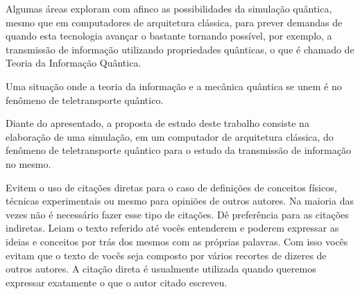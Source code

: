 \documentclass[12pt,oneside,brazil,hidelinks,article,sumario=tradicional,a4paper]{abntex2}
\begin{document}
Algumas áreas exploram com afinco as possibilidades da simulação quântica, mesmo que em computadores de arquitetura clássica, para prever demandas de quando esta tecnologia avançar o bastante tornando possível, por exemplo, a transmissão de informação utilizando propriedades quânticas, o que é chamado de Teoria da Informação Quântica.

Uma situação onde a teoria da informação e a mecânica quântica se unem é no fenômeno de teletransporte quântico.

Diante do apresentado, a proposta de estudo deste trabalho consiste na elaboração de uma simulação, em um computador de arquitetura clássica, do fenômeno de teletransporte quântico para o estudo da transmissão de informação no mesmo.



Evitem o uso de citações diretas para o caso de definições de conceitos físicos, técnicas experimentais ou mesmo para opiniões de outros autores. Na maioria das vezes não é necessário fazer esse tipo de citações. Dê preferência para as citações indiretas. Leiam o texto referido até vocês entenderem e poderem expressar as ideias e conceitos por trás dos mesmos com as próprias palavras. Com isso vocês evitam que o texto de vocês seja composto por vários recortes de dizeres de outros autores. A citação direta é usualmente utilizada quando queremos expressar exatamente o que o autor citado escreveu.

\end{document}
